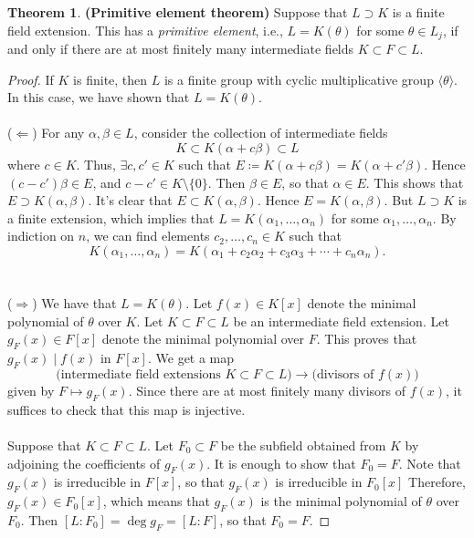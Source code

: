 \documentclass[10pt,letterpaper,cm]{nupset}
\theoremstyle{definition}
\newtheorem{theorem}{Theorem}
\newcommand{\1}{\mathbf{1}}
\newcommand{\0}{\vec 0}
\begin{document}
\begin{theorem}{\textbf{(Primitive element theorem)}}
Suppose that $L \supset K$ is a finite field extension. This has a \textit{primitive element}, i.e.,  $L= K(\theta)$ for some $\theta \in L_j$, if and only if there are at most finitely many intermediate fields $K \subset F \subset L$.
\end{theorem}
\begin{proof}
If $K$ is finite, then $L$ is a finite group with cyclic multiplicative group $\langle \theta \rangle$. In this case, we have shown  that $L = K(\theta)$.
\\ \\
($\Longleftarrow$) For any $\alpha, \beta \in L$, consider the collection of intermediate fields $$K \subset K(\alpha + c\beta) \subset L$$ where $c\in K$. Thus,  $ \exists c, c' \in K$ such that $E\coloneqq  K(\alpha + c \beta) = K(\alpha + c' \beta)$. Hence $(c - c')\beta \in E$, and $c- c' \in K \setminus \{0\}$. Then $ \beta \in E$, so that $\alpha \in E$. This shows that $E \supset K(\alpha, \beta)$. It's clear that $E \subset K(\alpha, \beta)$. Hence $E = K(\alpha, \beta)$. But $L \supset K$ is a finite extension, which implies that $L = K(\alpha_1, \ldots, \alpha_n)$ for some $\alpha_1, \ldots, \alpha_n$. By indiction on $n$, we can find elements $c_2, \ldots, c_n \in K$ such that $$ K(\alpha_1, \ldots, \alpha_n) = K(\alpha_1 + c_2\alpha_2 + c_3\alpha_3 + \cdots + c_n \alpha_n ) . $$
\\ \\
($\Longrightarrow$) We have that $L= K(\theta)$. Let $f(x) \in K[x]$ denote the minimal polynomial of $\theta$ over $K$. Let $K \subset F \subset L$ be an intermediate field extension. Let $g_F(x) \in F[x]$ denote the minimal polynomial over $F$. This proves that $g_F(x) \mid f(x)$ in $F[x]$. We get a map $$\text{(intermediate field extensions } K \subset F \subset L\text{)} \to \text{(divisors of } f(x)\text{)}$$ given by $F \mapsto g_F(x)$. Since there are at most finitely many divisors of $f(x)$, it suffices to check that this map is injective. 
\\ \\ Suppose that $K \subset F \subset L$. Let $F_0 \subset F$ be the subfield obtained from $K$ by adjoining the coefficients of $g_F(x)$. It is enough to show that $F_0 = F$. Note that $g_F(x)$ is irreducible in $F[x]$, so that $g_F(x)$ is irreducible in $F_0[x]$ Therefore, $g_F(x) \in F_0[x]$, which means that $g_F(x)$ is the minimal polynomial of $\theta$ over $F_0$. Then $[L: F_0] = \deg{g_F} = [L: F]$, so that $F_0 = F$. 
\end{proof}
\end{document}
